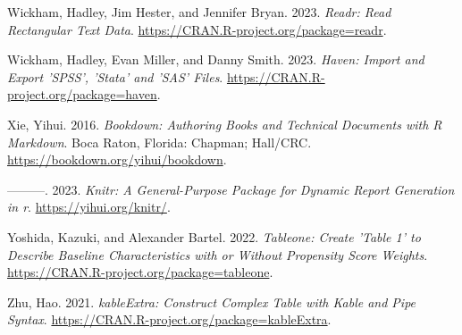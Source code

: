 \documentclass[
  letterpaper,
]{krantz}
\newlength{\cslhangindent}
\newlength{\cslentryspacingunit} %
\newenvironment{CSLReferences}[2] %
 {%
  \setlength{\parindent}{0pt}
  \ifodd #1
  \let\oldpar\par
  \def\par{\hangindent=\cslhangindent\oldpar}
  \fi
  \setlength{\parskip}{#2\cslentryspacingunit}
 }%
 {}
\begin{document}
\begin{CSLReferences}{1}{0}
\leavevmode{}%
Wickham, Hadley, Jim Hester, and Jennifer Bryan. 2023. \emph{Readr: Read
Rectangular Text Data}. \url{https://CRAN.R-project.org/package=readr}.

\leavevmode{}%
Wickham, Hadley, Evan Miller, and Danny Smith. 2023. \emph{Haven: Import
and Export 'SPSS', 'Stata' and 'SAS' Files}.
\url{https://CRAN.R-project.org/package=haven}.

\leavevmode{}%
Xie, Yihui. 2016. \emph{Bookdown: Authoring Books and Technical
Documents with {R} Markdown}. Boca Raton, Florida: Chapman; Hall/CRC.
\url{https://bookdown.org/yihui/bookdown}.

\leavevmode{}%
---------. 2023. \emph{Knitr: A General-Purpose Package for Dynamic
Report Generation in r}. \url{https://yihui.org/knitr/}.

\leavevmode{}%
Yoshida, Kazuki, and Alexander Bartel. 2022. \emph{Tableone: Create
'Table 1' to Describe Baseline Characteristics with or Without
Propensity Score Weights}.
\url{https://CRAN.R-project.org/package=tableone}.

\leavevmode{}%
Zhu, Hao. 2021. \emph{kableExtra: Construct Complex Table with Kable and
Pipe Syntax}. \url{https://CRAN.R-project.org/package=kableExtra}.

\end{CSLReferences}



\backmatter
\printindex
\end{document}
